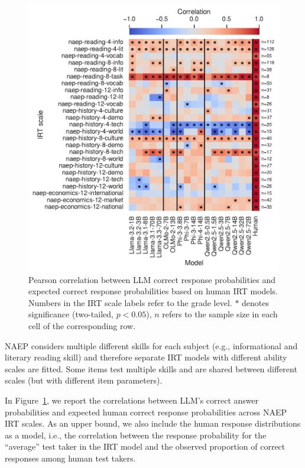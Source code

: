 \documentclass[11pt]{article}
\begin{document}
\begin{figure}
  \centering
  \includegraphics[width=\columnwidth]{figures/irt-correlation.pdf}
  \caption{Pearson correlation between LLM correct response probabilities and expected correct response probabilities based on human IRT models. Numbers in the IRT scale labels refer to the grade level. $*$ denotes significance (two-tailed, $p < 0.05$), $n$ refers to the sample size in each cell of the corresponding row.}
  \label{fig:irt-correlation}
\end{figure}

NAEP considers multiple different skills for each subject (e.g., informational and literary reading skill) and therefore separate IRT models with different ability scales are fitted. Some items test multiple skills and are shared between different scales (but with different item parameters).

In Figure~\ref{fig:irt-correlation}, we report the correlations between LLM's correct answer probabilities and expected human correct response probabilities across NAEP IRT scales. As an upper bound, we also include the human response distributions as a model, i.e., the correlation between the response probability for the ``average'' test taker in the IRT model and the observed proportion of correct responses among human test takers.
\end{document}
